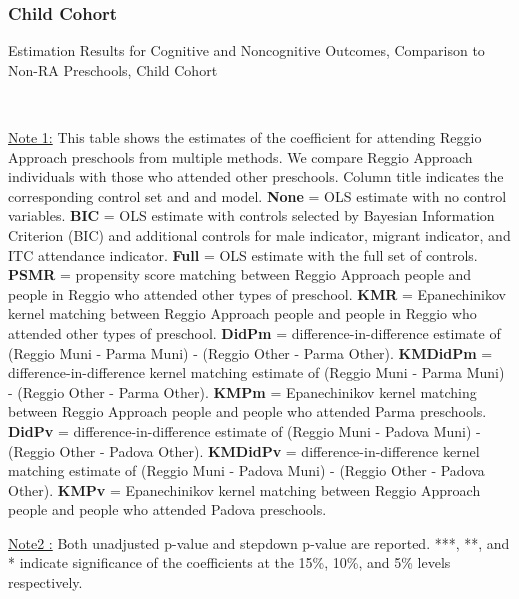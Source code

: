 \subsubsection{Child Cohort}
\begin{table}[H] \caption{Estimation Results for Cognitive and Noncognitive Outcomes, Comparison to Non-RA Preschools, Child Cohort} \label{combined_child_CN_Other}
\scalebox{0.59}{}
\vspace{1ex} \\
\footnotesize\raggedright{\underline{Note 1:} This table shows the estimates of the coefficient for attending Reggio Approach preschools from multiple methods. We compare Reggio Approach individuals with those who attended other preschools. Column title indicates the corresponding control set and and model. \textbf{None} = OLS estimate with no control variables. \textbf{BIC} = OLS estimate with controls selected by Bayesian Information Criterion (BIC) and additional controls for male indicator, migrant indicator, and ITC attendance indicator. \textbf{Full} = OLS estimate with the full set of controls. \textbf{PSMR} =  propensity score matching between Reggio Approach people and people in Reggio who attended other types of preschool. \textbf{KMR} = Epanechinikov kernel matching between Reggio Approach people and people in Reggio who attended other types of preschool. \textbf{DidPm} = difference-in-difference estimate of (Reggio Muni - Parma Muni) - (Reggio Other - Parma Other). \textbf{KMDidPm} = difference-in-difference kernel matching estimate of (Reggio Muni - Parma Muni) - (Reggio Other - Parma Other).   \textbf{KMPm} = Epanechinikov kernel matching between Reggio Approach people and people who attended Parma preschools. \textbf{DidPv} = difference-in-difference estimate of (Reggio Muni - Padova Muni) - (Reggio Other - Padova Other). \textbf{KMDidPv} = difference-in-difference kernel matching estimate of (Reggio Muni - Padova Muni) - (Reggio Other - Padova Other).  \textbf{KMPv} = Epanechinikov kernel matching between Reggio Approach people and people who attended Padova preschools.} 

\footnotesize\raggedright{\underline{Note2 :} Both unadjusted p-value and stepdown p-value are reported. ***, **, and * indicate significance of the coefficients at the 15\%, 10\%, and 5\% levels respectively.}
\end{table}


